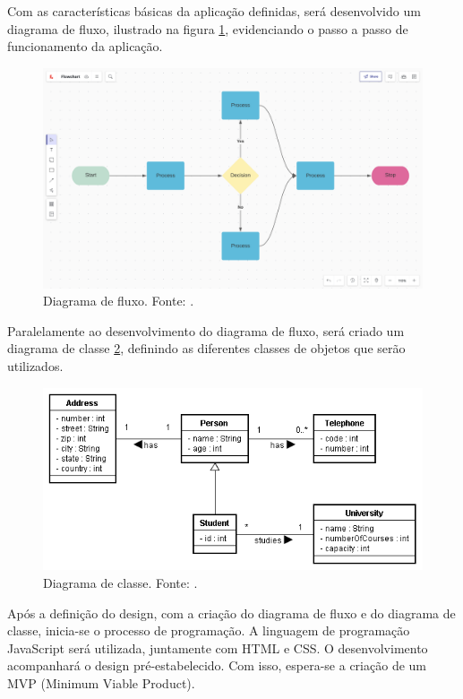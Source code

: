 \documentclass[
	12pt,				%
	openright,			%
	oneside,			%
	a4paper,			%
	english,			%
	brazil				%
	]{abntex2}
\begin{document}
Com as características básicas da aplicação definidas, será desenvolvido um diagrama de fluxo, ilustrado na figura \ref{fig:diagrama_fluxo}, evidenciando o passo a passo de funcionamento da aplicação. 

\begin{figure}[ht] 
	\centering
	\includegraphics[scale=0.4]{exemplo_diagrama_de_fluxo.png}
	\caption[Exemplo de diagrama de fluxo]{Diagrama de fluxo. Fonte: \textcite{boyle1772}.}
	\label{fig:diagrama_fluxo}
\end{figure}

Paralelamente ao desenvolvimento do diagrama de fluxo, será criado um diagrama de classe \ref{fig:diagrama_classe}, definindo as diferentes classes de objetos que serão utilizados.

\begin{figure}[ht] 
	\centering
	\includegraphics[scale=0.6]{exemplo_diagrama_de_classe.png}
	\caption[Exemplo de diagrama de classe]{Diagrama de classe. Fonte: \textcite{boyle1772}.}
	\label{fig:diagrama_classe}
\end{figure}

\newpage

Após a definição do design, com a criação do diagrama de fluxo e do diagrama de classe, inicia-se o processo de programação. A linguagem de programação JavaScript será utilizada, juntamente com HTML e CSS. O desenvolvimento acompanhará o design pré-estabelecido. Com isso, espera-se a criação de um MVP (Minimum Viable Product).
\end{document}
